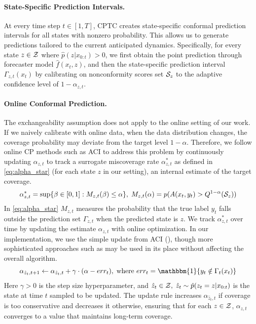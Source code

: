 \vspace{-0.5em}
\paragraph{State-Specific Prediction Intervals.}  At every time step $t\in [1, T]$, CPTC creates state-specific conformal prediction intervals
for all states with nonzero probability. This allows us to generate predictions tailored to the current anticipated dynamics. Specifically, for every state $z\in {\mathcal{Z}}$ where $\hat{p}(z|x_{0:t}) > 0$, we first obtain the point prediction through forecaster model $\hat{f}(x_t, z)$, and then the state-specific prediction interval $\Gamma_{z,t}(x_t)$ by calibrating on nonconformity scores set ${\mathcal{S}}_z$ to the adaptive confidence level of $1-\alpha_{z,t}$.


\vspace{-0.5em}
\paragraph{Online Conformal Prediction.}
The exchangeability assumption does not apply to the online setting of our work. If we naively calibrate with online data, when the data distribution changes, the coverage probability may deviate from the target level $1-\alpha$. Therefore, we follow online CP methods such as ACI \citep{gibbs2021adaptive} to address this problem by continuously updating $\alpha_{z,t}$ to track a surrogate miscoverage rate $\alpha_{z,t}^*$ as defined in \eqref{eq:alpha_star} (for each state $z$ in our setting), an internal estimate of the target coverage.
%
\begin{equation}
    \alpha^*_{z,t} = \sup\{\beta \in [0, 1] : M_{z,t}(\beta) \leq \alpha\}, \; M_{z,t}(\alpha) = p(A(x_t, y_t) > Q^{1 - \alpha}({\mathcal{S}}_z))  
    \label{eq:alpha_star}
\end{equation}
%
In \eqref{eq:alpha_star} $M_{z,t}$ measures the probability that the true label $y_t$ falls outside the prediction set $\Gamma_{z,t}$ when the predicted state is $z$. %
We track $\alpha^*_{z,t}$ over time by updating the estimate $\alpha_{z,t}$ with online optimization. In our implementation, we use the simple update from ACI (), though more sophisticated approaches such as \citep{angelopoulos2024pid} may be used in its place without affecting the overall algorithm.
\begin{equation}
\alpha_{\hat{z}_t, t+1} \leftarrow \alpha_{\hat{z}_t, t} + \gamma \cdot (\alpha - err_t), \; \text{where } err_t = \mathbbm{1} \{y_t \notin \Gamma_t(x_t) \}
\label{eq:aci_update}
\end{equation}
Here $\gamma > 0$ is the step size hyperparameter, and $\hat{z}_t \in {\mathcal{Z}}, \; \hat{z}_t \sim \hat{p}(z_t = z |x_{0:t})$ is the state at time $t$ sampled to be updated. The update rule increases $\alpha_{\hat{z}_t, t}$ if coverage is too conservative and decreases it otherwise, ensuring that for each $z \in {\mathcal{Z}}$, $\alpha_{z,t}$ converges to a value that maintains long-term coverage. 


